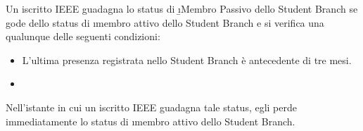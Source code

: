 
\begin{regl}
	Un iscritto IEEE guadagna lo status di \b{\i{Membro Passivo}} dello Student Branch se gode dello status di \i{membro attivo} dello Student Branch e si verifica una qualunque delle seguenti condizioni:
	\begin{itemize}
		\item L'ultima presenza registrata nello Student Branch è antecedente di tre mesi.
		\item 
	\end{itemize}
	Nell'istante in cui un iscritto IEEE guadagna tale status, egli perde immediatamente lo status di \i{membro attivo} dello Student Branch.
\end{regl}